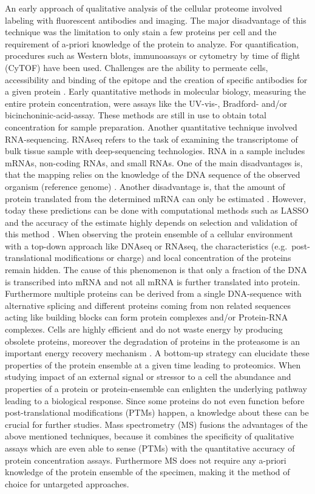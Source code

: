 \documentclass[
  11pt,
]{article}
\begin{document}
An early approach of qualitative analysis of the cellular proteome involved labeling with fluorescent antibodies and imaging. The major disadvantage of this technique was the limitation to only stain a few proteins per cell and the requirement of a-priori knowledge of the protein to analyze. For quantification, procedures such as Western blots, immunoassays or cytometry by time of flight (CyTOF) have been used. Challenges are the ability to permeate cells, accessibility and binding of the epitope and the creation of specific antibodies for a given protein \citep{Budnik2018}.
Early quantitative methods in molecular biology, measuring the entire protein concentration, were assays like the UV-vis-, Bradford- and/or bicinchoninic-acid-assay. These methods are still in use to obtain total concentration for sample preparation.
Another quantitative technique involved RNA-sequencing. RNAseq refers to the task of examining the transcriptome of bulk tissue sample with deep-sequencing technologies. RNA in a sample includes mRNAs, non-coding RNAs, and small RNAs. One of the main disadvantages is, that the mapping relies on the knowledge of the DNA sequence of the observed organism (reference genome) \citep{Wang2009}. Another disadvantage is, that the amount of protein translated from the determined mRNA can only be estimated \citep{Gygi1999}. However, today these predictions can be done with computational methods such as LASSO and the accuracy of the estimate highly depends on selection and validation of this method \citep{Magnusson2022}.
When observing the protein ensemble of a cellular environment with a top-down approach like DNAseq or RNAseq, the characteristics (e.g.~post-translational modifications or charge) and local concentration of the proteins remain hidden. The cause of this phenomenon is that only a fraction of the DNA is transcribed into mRNA and not all mRNA is further translated into protein. Furthermore multiple proteins can be derived from a single DNA-sequence with alternative splicing and different proteins coming from non related sequences acting like building blocks can form protein complexes and/or Protein-RNA complexes. Cells are highly efficient and do not waste energy by producing obsolete proteins, moreover the degradation of proteins in the proteasome is an important energy recovery mechanism \citep{TANAKA2009}. A bottom-up strategy can elucidate these properties of the protein ensemble at a given time leading to proteomics.
When studying impact of an external signal or stressor to a cell the abundance and properties of a protein or protein-ensemble can enlighten the underlying pathway leading to a biological response. Since some proteins do not even function before post-translational modifications (PTMs) happen, a knowledge about these can be crucial for further studies.
Mass spectrometry (MS) fusions the advantages of the above mentioned techniques, because it combines the specificity of qualitative assays which are even able to sense (PTMs) with the quantitative accuracy of protein concentration assays. Furthermore MS does not require any a-priori knowledge of the protein ensemble of the specimen, making it the method of choice for untargeted approaches.
\end{document}
